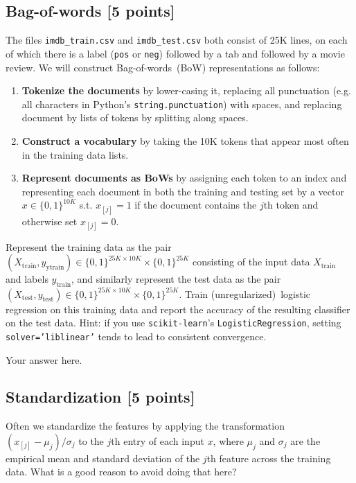 \documentclass[a4paper]{article}
\theoremstyle{definition}
\begin{document}
\subsection{Bag-of-words [5 points]}\label{sec:bow}

The files {\tt imdb\_train.csv} and {\tt imdb\_test.csv} both consist of 25K lines, on each of which there is a label ({\tt pos} or {\tt neg}) followed by a tab and followed by a movie review.
We will construct Bag-of-words~(BoW) representations as follows:
\begin{enumerate}
	\item {\bf Tokenize the documents} by lower-casing it, replacing all punctuation (e.g. all characters in Python's {\tt string.punctuation}) with spaces, and replacing document by lists of tokens by splitting along spaces.
	\item {\bf Construct a vocabulary} by taking the 10K tokens that appear most often in the training data lists.
	\item {\bf Represent documents as BoWs} by assigning each token to an index and representing each document in both the training and testing set by a vector $x\in\{0,1\}^{10K}$ s.t. $x_{[j]}=1$ if the document contains the $j$th token and otherwise set $x_{[j]}=0$.
\end{enumerate}

Represent the training data as the pair $(X_\textrm{train},y_\textrm{ytrain})\in\{0,1\}^{25K\times10K}\times\{0,1\}^{25K}$ consisting of the input data $X_\textrm{train}$ and labels $y_\textrm{train}$, and similarly represent the test data as the pair $(X_\textrm{test},y_\textrm{test})\in\{0,1\}^{25K\times10K}\times\{0,1\}^{25K}$.
Train (unregularized)~logistic regression on this training data and report the accuracy of the resulting classifier on the test data.
Hint: if you use {\tt scikit-learn}'s {\tt LogisticRegression}, setting {\tt solver='liblinear'} tends to lead to consistent convergence.

{\color{blue}
		Your answer here.
}

\subsection{Standardization [5 points]}\label{sec:standardization}

Often we standardize the features by applying the transformation $(x_{[j]}-\mu_j)/\sigma_j$ to the $j$th entry of each input $x$, where $\mu_j$ and $\sigma_j$ are the empirical mean and standard deviation of the $j$th feature across the training data.
What is a good reason to avoid doing that here?
\end{document}
